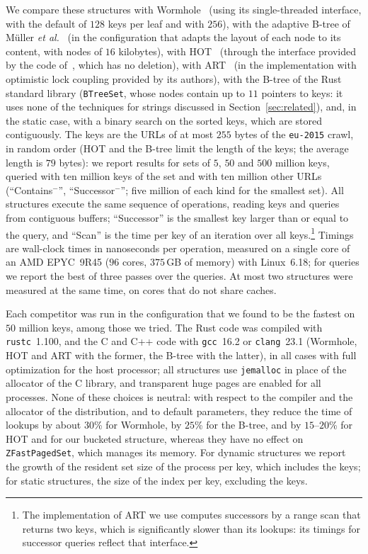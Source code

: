 \documentclass[a4paper]{article}
\newcommand{\?}{\mskip1.5mu}
\begin{document}
We compare these structures with Wormhole~\cite{WNJWormhole} (using its single-threaded interface, with the default of $128$ keys per leaf and with $256$), 
with the adaptive B-tree of M\"uller \textit{et al.}~\cite{Muller2025BTrees} (in the configuration that adapts the layout of each node to its content, 
with nodes of $16$ kilobytes), with HOT~\cite{Binna2018HOT} (through the interface provided by the code of~\cite{Muller2025BTrees}, which has no deletion), 
with ART~\cite{Leis2013Adaptive} (in the implementation with optimistic lock coupling provided by its authors), with the B-tree of the Rust standard library (\texttt{BTreeSet}, whose 
nodes contain up to $11$ pointers to keys: it uses none of the techniques for strings discussed in Section~\ref{sec:related}), and, in the static case, with a binary search on the sorted keys, 
which are stored contiguously. The keys are the URLs of at most $255$ bytes of the \texttt{eu-2015} crawl, in random order (HOT and the B-tree limit the length of the keys; the average length is $79$ bytes): 
we report results for sets of $5$, $50$ and $500$ million keys, queried with ten million keys of the set and with ten million other URLs 
(``Contains$^-$'', ``Successor$^-$''; five million of each kind for the smallest set).  
All structures execute the same sequence of operations, reading keys and queries from contiguous buffers; ``Successor'' is the smallest key larger than or equal to the query, 
and ``Scan'' is the time per key of an iteration over all keys.\footnote{The implementation of ART we use computes successors by a range scan that 
returns two keys, which is significantly slower than its lookups: its timings for successor queries reflect that interface.} Timings are wall-clock times in nanoseconds per operation, measured on 
a single core of an AMD EPYC~9R45 ($96$ cores, $375$\,GB of memory) with Linux~6.18; for queries we report the best of three passes over the queries. 
At most two structures were measured at the same time, on cores that do not share caches.

Each competitor was run in the configuration that we found to be the fastest on $50$ million keys, 
among those we tried. 
The Rust code was compiled with \texttt{rustc}~1.100, and the C and C++ code with \texttt{gcc}~16.2 or \texttt{clang}~23.1 
(Wormhole, HOT and ART with the former, the B-tree with the latter), in all cases with full optimization for the host processor; 
all structures use \texttt{jemalloc} in place of the allocator of the C library, and transparent huge pages are enabled for all processes. 
None of these choices is neutral: with respect to the compiler and the allocator of the distribution, and to default parameters, 
they reduce the time of lookups by about $30$\% for Wormhole, by $25$\% for the B-tree, and by $15$--$20$\% for HOT and for our bucketed structure, 
whereas they have no effect on \texttt{ZFastPagedSet}, which manages its memory. 
For dynamic structures we report the growth of the resident set size of the process per key, which includes the keys; 
for static structures, the size of the index per key, excluding the keys.
\end{document}
